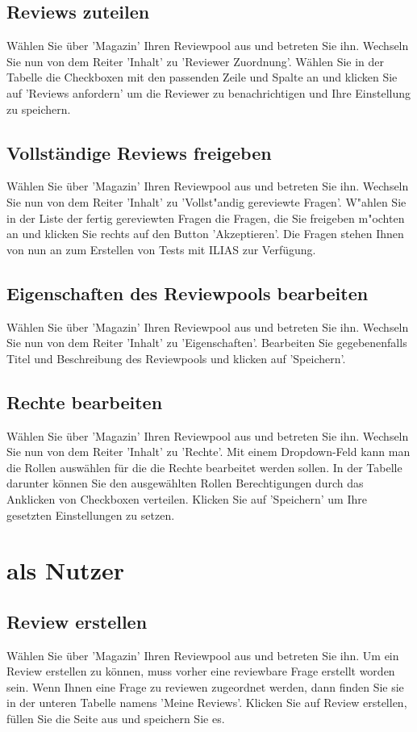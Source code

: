 \documentclass[12pt,a4paper]{scrreprt}
\begin{document}
\subsection{Reviews zuteilen}
Wählen Sie über 'Magazin' Ihren Reviewpool aus und betreten Sie ihn. Wechseln Sie nun von dem Reiter 'Inhalt' zu 'Reviewer Zuordnung'. Wählen Sie in der Tabelle die Checkboxen mit den passenden Zeile und Spalte an und klicken Sie auf 'Reviews anfordern' um die Reviewer zu benachrichtigen und Ihre Einstellung zu speichern.
		
\subsection{Vollständige Reviews freigeben}
Wählen Sie über 'Magazin' Ihren Reviewpool aus und betreten Sie ihn. Wechseln Sie nun von dem Reiter 'Inhalt' zu 'Vollst"andig gereviewte Fragen'. W"ahlen Sie in der Liste der fertig gereviewten Fragen die Fragen, die Sie freigeben m"ochten an und klicken Sie rechts auf den Button 'Akzeptieren'. Die Fragen stehen Ihnen von nun an zum Erstellen von Tests mit ILIAS zur Verfügung.
		
\subsection{Eigenschaften des Reviewpools bearbeiten}
Wählen Sie über 'Magazin' Ihren Reviewpool aus und betreten Sie ihn. Wechseln Sie nun von dem Reiter 'Inhalt' zu 'Eigenschaften'. Bearbeiten Sie gegebenenfalls Titel und Beschreibung des Reviewpools und klicken auf 'Speichern'. 
		
\subsection{Rechte bearbeiten}
Wählen Sie über 'Magazin' Ihren Reviewpool aus und betreten Sie ihn. Wechseln Sie nun von dem Reiter 'Inhalt' zu 'Rechte'. Mit einem Dropdown-Feld kann man die Rollen auswählen für die die Rechte bearbeitet werden sollen. In der Tabelle darunter können Sie den ausgewählten Rollen Berechtigungen durch das Anklicken von Checkboxen verteilen. Klicken Sie auf 'Speichern' um Ihre gesetzten Einstellungen zu setzen. 
		
\section{als Nutzer}
	
\subsection{Review erstellen}
Wählen Sie über 'Magazin' Ihren Reviewpool aus und betreten Sie ihn. Um ein Review erstellen zu können, muss vorher eine reviewbare Frage erstellt worden sein. Wenn Ihnen eine Frage zu reviewen zugeordnet werden, dann finden Sie sie in der unteren Tabelle namens 'Meine Reviews'. Klicken Sie auf Review erstellen, füllen Sie die Seite aus und speichern Sie es. 		
		
\end{document}
